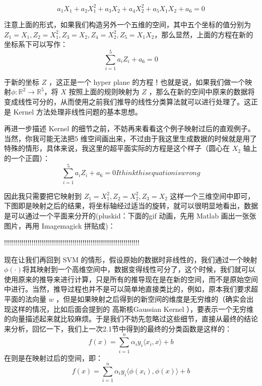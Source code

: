 \documentclass[a4paper,12pt]{article}
\begin{document}
\begin{equation}
  a_1X_1+a_2X_1^2+ a_3X_2+a_4X_2^2+a_5X_1X_2+a_6=0
\end{equation}

 注意上面的形式，如果我们构造另外一个五维的空间，其中五个坐标的值分别为 $Z_1=X_1, Z_2=X^2_1, Z_3=X_2, Z_4=X^2_2, Z_5=X_1X_2$，那么显然，上面的方程在新的坐标系下可以写作：
\begin{equation}
  \sum_{i=1}^5a_iZ_i+a_6=0
\end{equation}

于新的坐标 $Z$ ，这正是一个 hyper plane 的方程！也就是说，如果我们做一个映射$\phi:\mathbb{R}^2\rightarrow\mathbb{R}^5$，将 $X$ 按照上面的规则映射为 $Z$ ，那么在新的空间中原来的数据将变成线性可分的，从而使用之前我们推导的线性分类算法就可以进行处理了。这正是 Kernel 方法处理非线性问题的基本思想。

再进一步描述 Kernel 的细节之前，不妨再来看看这个例子映射过后的直观例子。当然，你我可能无法把$ 5$ 维空间画出来，不过由于我这里生成数据的时候就是用了特殊的情形，具体来说，我这里的超平面实际的方程是这个样子（圆心在 $X_2$ 轴上的一个正圆）：
\begin{equation}
  \sum_{i=1}^5a_iZ_i+a_6=0
  I think this equation is wrong
\end{equation}

因此我只需要把它映射到 $Z_1=X^2_1, Z_2=X_2^2, Z_3=X_2$ 这样一个三维空间中即可，下图即是映射之后的结果，将坐标轴经过适当的旋转，就可以很明显地看出，数据是可以通过一个平面来分开的(pluskid：下面的gif 动画，先用 Matlab 画出一张张图片，再用 Imagemagick 拼贴成)：

!!!!!!!!!!!!!!!!!!!!!!!!!!!!!!!!!!!!!!!!!!!!!!!!!!!!!!!!!!!!!!!!!!!!!

现在让我们再回到 SVM 的情形，假设原始的数据时非线性的，我们通过一个映射$\phi(\cdot)$将其映射到一个高维空间中，数据变得线性可分了，这个时候，我们就可以使用原来的推导来进行计算，只是所有的推导现在是在新的空间，而不是原始空间中进行。当然，推导过程也并不是可以简单地直接类比的，例如，原本我们要求超平面的法向量 $w$ ，但是如果映射之后得到的新空间的维度是无穷维的（确实会出现这样的情况，比如后面会提到的 高斯核Gaussian Kernel ），要表示一个无穷维的向量描述起来就比较麻烦。于是我们不妨先忽略过这些细节，直接从最终的结论来分析，回忆一下，我们上一次2.1节中得到的最终的分类函数是这样的：
\begin{equation}
  f(x)=\sum_{i=1}^n\alpha_iy_i\langle x_i,x\rangle+b
\end{equation}
在则是在映射过后的空间，即：
\begin{equation}
  f(x)=\sum_{i=1}^n\alpha_iy_i\langle\phi(x_i),\phi(x)\rangle+b
\end{equation}
\end{document}

